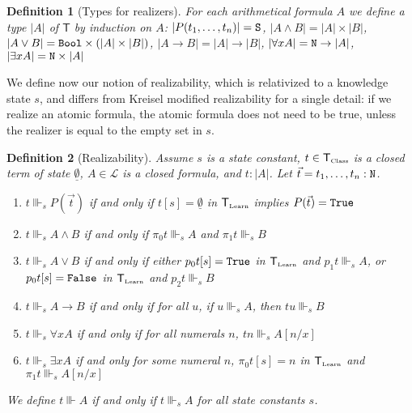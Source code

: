 \documentclass[copyright,creativecommons]{eptcs}
\newcommand{\Nat}                      { {\tt N} }
\newcommand{\Bool}                     { {\tt Bool} }
\newcommand{\State}                    { {\tt S} }
\newcommand{\SystemT}                  {\mathsf{T}}
\newcommand{\True}                     { {\tt{True}} }
\newcommand{\False}                    { {\tt{False}} }
\newcommand{\Class}                    {\mbox{\tiny Class}}
\newcommand{\Learn}                    {\mbox{\tiny Learn}}
\newcommand{\SystemTClass}             {{\SystemT_{\Class}}}
\newcommand{\SystemTLearn}             {{\SystemT_{\Learn}}}
\newcommand{\proj}                     { {p} }
\newcommand{\makestate}      [1]       { {\underline{#1}} }
\newtheorem{definition}{Definition}
\begin{document}
\begin{definition}[Types for realizers]
\label{definition-TypesForRealizers} For each
arithmetical formula $A$ we define a type $|A|$ of $\SystemT$ by
induction on $A$:
$|P(t_1,\ldots,t_n)|=\State$,
$|A\wedge B|=|A|\times |B|$,
$|A\vee B|= \Bool\times (|A|\times |B|)$,
$|A\rightarrow B|=|A|\rightarrow |B|$,
$|\forall x A|=\Nat\rightarrow |A|$,
$|\exists x A|= \Nat\times |A|$
\end{definition}
We define now our notion of realizability, which is relativized to a knowledge state $s$, and differs from Kreisel modified realizability for a single detail: if we realize an atomic formula, the atomic formula does not need to be true, unless the realizer is equal to the empty set in $s$.
\begin{definition}[Realizability]
\label{lemma-IndexedRealizabilityAndRealizability}
Assume $s$ is a state constant, $t\in \SystemTClass$ is a closed term of state $\makestate{\emptyset}$, $A \in \mathcal{L} $ is a closed formula, and $t:|A|$. Let $\vec{t} = t_1, \ldots, t_n : \Nat$.

\begin{enumerate}
\item
$t\Vvdash_s P(\vec{t})$ if and only if $t[s]  = \makestate{\emptyset}$ in $\SystemTLearn$ implies
$P(\vec{t})={\True}$


\item
$t\Vvdash_s{A\wedge B}$ if and only if $\pi_0t \Vvdash_s{A}$ and $\pi_1t\Vvdash_s{B}$

\item
$t\Vvdash_s {A\vee B}$  if and only if either $\proj_0t[{s}]={\True}$ in $\SystemTLearn$ and $\proj_1t\Vvdash_s A$, or $\proj_0t[{s}]={\False}$ in $\SystemTLearn$ and $\proj_2t\Vvdash_s B$

\item
$t\Vvdash_s {A\rightarrow B}$ if and only if for all $u$, if $u\Vvdash_s{A}$,
then $tu\Vvdash_s{B}$

\item
$t\Vvdash_s {\forall x A}$ if and only if for all numerals $n$,
$t{n}\Vvdash_s A[{n}/x]$
\item

$t\Vvdash_s \exists x A$ if and only for some numeral $n$, $\pi_0t[{s}]= {n}$ in $\SystemTLearn$ and $\pi_1t \Vvdash_s A[{n}/x]$
\end{enumerate}
We define $t \Vvdash A$ if and only if $t\Vvdash_s A$ for all state constants $s$.
\end{definition}
\end{document}
